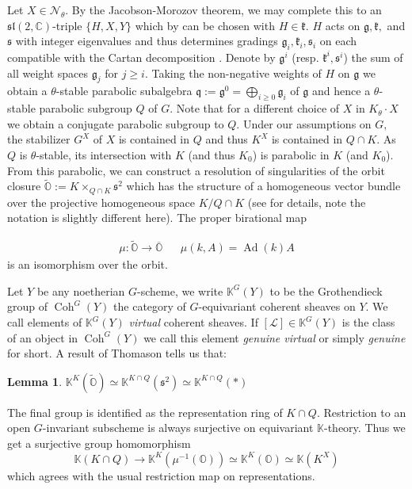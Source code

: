 \documentclass[letterpaper,twosided,11pt]{article}
\theoremstyle{plain}
\newtheorem*{nlemma}{Lemma}
\theoremstyle{definition}
\theoremstyle{remark}
\newcommand{\C}{\mathbb{C}}
\newcommand{\OO}{\mathbb{O}}
\newcommand{\close}[1]{\overline{#1}}
\newcommand{\lie}[1]{\mathfrak{#1}}
\newcommand{\Ad}{\operatorname{Ad}}
\begin{document}
Let $X\in \mathcal{N}_\theta.$ By the Jacobson-Morozov theorem, we may complete this to an $\lie{sl}(2,\C)$-triple $\{H,X,Y\}$ which by \cite[Proposition 4]{KostantRallis1971} can be chosen with $H\in \lie{k}.$ $H$ acts on $\lie{g}, \lie{k},$ and $\lie{s}$ with integer eigenvalues and thus determines gradings $\lie{g}_i, \lie{k}_i, \lie{s}_i$ on each compatible with the Cartan decomposition \cite[Lemma 3.5]{Cook2025}. Denote by $\lie{g}^i$ (resp. $\lie{k}^i, \lie{s}^i$) the sum of all weight spaces $\lie{g}_j$ for $j\geq i.$ Taking the non-negative weights of $H$ on $\lie{g}$ we obtain a $\theta$-stable parabolic subalgebra $\lie{q}:=\lie{g}^0=\bigoplus_{i\geq 0} \lie{g}_i$ of $\lie{g}$ and hence a $\theta$-stable parabolic subgroup $Q$ of $G.$ Note that for a different choice of $X$ in $K_\theta\cdot X$ we obtain a conjugate parabolic subgroup to $Q$. Under our assumptions on $G,$ the stabilizer $G^X$ of $X$ is contained in $Q$ and thus $K^X$ is contained in $Q\cap K.$ As $Q$ is $\theta$-stable, its intersection with $K$ (and thus $K_0$) is parabolic in $K$ (and $K_0$). From this parabolic, we can construct a resolution of singularities of the orbit closure $\widetilde{\mathbb{O}}:=K\times_{Q\cap K} \lie{s}^2$ which has the structure of a homogeneous vector bundle over the projective homogeneous space $K/Q\cap K$ (see \cite[Section 3]{Cook2025} for details, note the notation is slightly different here). The proper birational map 

\begin{align*} \mu: \widetilde{\mathbb{O}}\to \close{\mathbb{O}} && \mu(k,A)=\Ad(k)A\end{align*}  is an isomorphism over the orbit. 


Let $Y$ be any noetherian $G$-scheme, we write $\mathbb{K}^G(Y)$ to be the Grothendieck group of $\operatorname{Coh}^G(Y)$ the category of $G$-equivariant coherent sheaves on $Y.$ We call elements of $ \mathbb{K}^G(Y)$ \textit{virtual} coherent sheaves. If $[\mathcal{L}]\in \mathbb{K}^G(Y)$ is the class of an object in $\operatorname{Coh}^G(Y)$ we call this element \textit{genuine virtual} or simply \textit{genuine} for short. A result of Thomason \cite[Proposition 6.2]{Thomason1987} tells us that:
 
\begin{nlemma}    
	$\mathbb{K}^{K}(\widetilde{\OO})\simeq \mathbb{K}^{K\cap Q}(\lie{s}^2)\simeq \mathbb{K}^{K\cap Q}(*)$
\end{nlemma} 
The final group is identified as the representation ring of $K\cap Q.$ Restriction to an open $G$-invariant subscheme is always surjective on equivariant $\mathbb{K}$-theory. Thus we get a surjective group homomorphism \begin{equation} \mathbb{K}(K\cap Q)\to \mathbb{K}^{K}(\mu^{-1}(\OO))\simeq \mathbb{K}^{K}(\OO)\simeq \mathbb{K}(K^X)\end{equation} 
which agrees with the usual restriction map on representations. 
\end{document}
